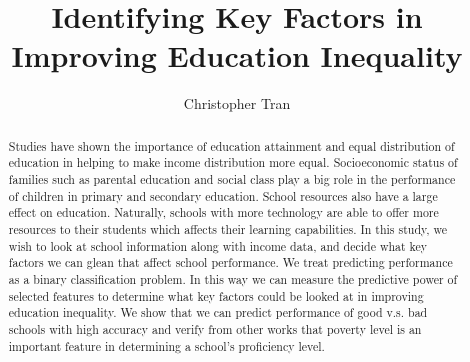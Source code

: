 \documentclass[sigconf]{acmart}
\begin{document}
\title{Identifying Key Factors in Improving Education Inequality}
  
\author{Christopher Tran}




\begin{abstract}
Studies have shown the importance of education attainment and equal distribution of education in helping to make income distribution more equal. Socioeconomic status of families such as parental education and social class play a big role in the performance of children in primary and secondary education. School resources also have a large effect on education. Naturally, schools with more technology are able to offer more resources to their students which affects their learning capabilities. In this study, we wish to look at school information along with income data, and decide what key factors we can glean that affect school performance. We treat predicting performance as a binary classification problem. In this way we can measure the predictive power of selected features to determine what key factors could be looked at in improving education inequality. We show that we can predict performance of good v.s. bad schools with high accuracy and verify from other works that poverty level is an important feature in determining a school's proficiency level.
\end{abstract}

\renewcommand\footnotetextcopyrightpermission[1]{} %
\pagestyle{plain} %

\maketitle




 
\end{document}
